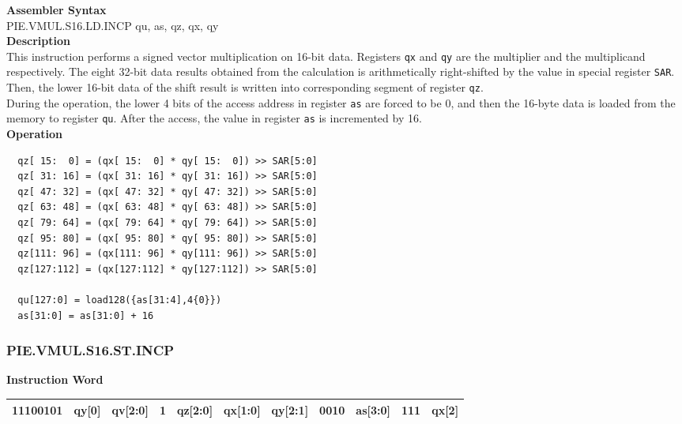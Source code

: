 \textbf{Assembler Syntax} \\
PIE.VMUL.S16.LD.INCP qu, as, qz, qx, qy \\
\textbf{Description} \\
This instruction performs a signed vector multiplication on 16-bit data. Registers \lstinline{qx} and \lstinline{qy} are the multiplier and the multiplicand respectively. The eight 32-bit data results obtained from the calculation is arithmetically right-shifted by the value in special register \lstinline{SAR}. Then, the lower 16-bit data of the shift result is written into corresponding segment of register \lstinline{qz}. \\ During the operation, the lower 4 bits of the access address in register \lstinline{as} are forced to be 0, and then the 16-byte data is loaded from the memory to register \lstinline{qu}. After the access, the value in register \lstinline{as} is incremented by 16.\\
\textbf{Operation}
\begin{lstlisting}
  qz[ 15:  0] = (qx[ 15:  0] * qy[ 15:  0]) >> SAR[5:0]
  qz[ 31: 16] = (qx[ 31: 16] * qy[ 31: 16]) >> SAR[5:0]
  qz[ 47: 32] = (qx[ 47: 32] * qy[ 47: 32]) >> SAR[5:0]
  qz[ 63: 48] = (qx[ 63: 48] * qy[ 63: 48]) >> SAR[5:0]
  qz[ 79: 64] = (qx[ 79: 64] * qy[ 79: 64]) >> SAR[5:0]
  qz[ 95: 80] = (qx[ 95: 80] * qy[ 95: 80]) >> SAR[5:0]
  qz[111: 96] = (qx[111: 96] * qy[111: 96]) >> SAR[5:0]
  qz[127:112] = (qx[127:112] * qy[127:112]) >> SAR[5:0]

  qu[127:0] = load128({as[31:4],4{0}})
  as[31:0] = as[31:0] + 16
\end{lstlisting}

\newpage
\subsubsection{PIE.VMUL.S16.ST.INCP}\label{instruction:PIEVMULS16STINCP}
\setlength\tabcolsep{6pt}
\textbf{Instruction Word} \\
\begin{tabular}{|c|c|c|c|c|c|c|c|c|c|c|}
	\hline
	11100101 & qy[0] & qv[2:0] & 1 & qz[2:0] & qx[1:0] & qy[2:1] & 0010 & as[3:0] & 111 & qx[2] \\
	\hline
\end{tabular}

